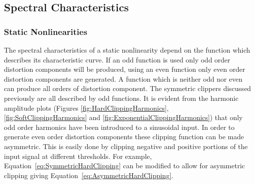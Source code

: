 %			
%
%			

	\subsection{Spectral Characteristics}
	\label{sec:ExcitationEvaluation-Comparison-SpectralCharacteristics}
		\subsubsection*{Static Nonlinearities}
			The spectral characteristics of a static nonlinearity depend on the function which describes its
			characteristic curve. If an odd function is used only odd order distortion components will be
			produced, using an even function only even order distortion components are generated. A function
			which is neither odd nor even can produce all orders of distortion component. The symmetric
			clippers discussed previously are all described by odd functions. It is evident from the harmonic
			amplitude plots (Figures \ref{fig:HardClippingHarmonics}, \ref{fig:SoftClippingHarmonics} and
			\ref{fig:ExponentialClippingHarmonics}) that only odd order harmonics have been introduced to a
			sinusoidal input. In order to generate even order distortion components these clipping function can
			be made asymmetric. This is easily done by clipping negative and positive portions of the input
			signal at different thresholds. For example, Equation~\ref{eq:SymmetricHardClipping} can be
			modified to allow for asymmetric clipping giving Equation~\ref{eq:AsymmetricHardClipping}.
			
